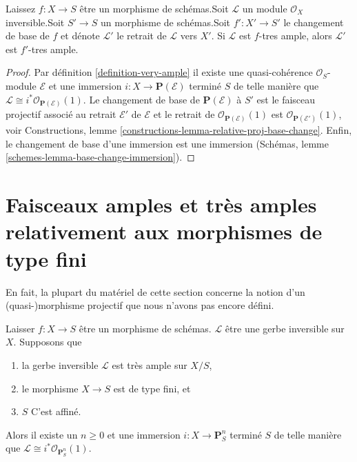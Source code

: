 \begin{lemma}

\label{lemma-very-ample-base-change}
Laissez $f : X \to S$ être un morphisme de schémas.Soit $\mathcal{L}$ un module $\mathcal{O}_X$ inversible.Soit $S' \to S$ un morphisme de schémas.Soit $f' : X' \to S'$ le changement de base de $f$ et dénote $\mathcal{L}'$ le retrait de $\mathcal{L}$ vers $X'$. Si $\mathcal{L}$ est $f$-tres ample, alors $\mathcal{L}'$ est $f'$-tres ample.
\end{lemma}

\begin{proof}

Par définition \ref{definition-very-ample} il existe une quasi-cohérence $\mathcal{O}_S$-module $\mathcal{E}$ et une immersion
$i : X \to \mathbf{P}(\mathcal{E})$ terminé $S$ de telle manière que
$\mathcal{L} \cong i^*\mathcal{O}_{\mathbf{P}(\mathcal{E})}(1)$. Le changement de base de $\mathbf{P}(\mathcal{E})$ à $S'$ est le faisceau projectif associé au retrait $\mathcal{E}'$
de $\mathcal{E}$ et le retrait de
$\mathcal{O}_{\mathbf{P}(\mathcal{E})}(1)$
est
$\mathcal{O}_{\mathbf{P}(\mathcal{E}')}(1)$, voir Constructions, lemme \ref{constructions-lemma-relative-proj-base-change}. Enfin, le changement de base d'une immersion est une immersion (Schémas, lemme \ref{schemes-lemma-base-change-immersion}).

\end{proof}







\section{Faisceaux amples et très amples relativement aux morphismes de type fini}
\label{section-ample-finite-type}

\noindent
En fait, la plupart du matériel de cette section concerne la notion d'un (quasi-)morphisme projectif que nous n'avons pas encore défini.

\begin{lemma}

\label{lemma-very-ample-finite-type-over-affine}

Laisser $f : X \to S$ être un morphisme de schémas. $\mathcal{L}$ être une gerbe inversible sur $X$. Supposons que

\begin{enumerate}

\item la gerbe inversible $\mathcal{L}$ est très ample sur $X/S$,
\item le morphisme $X \to S$ est de type fini, et
\item  $S$ C'est affiné.

\end{enumerate}

Alors il existe un $n \geq 0$ et une immersion
$i : X \to \mathbf{P}^n_S$ terminé $S$ de telle manière que
$\mathcal{L} \cong i^*\mathcal{O}_{\mathbf{P}^n_S}(1)$.

\end{lemma}

